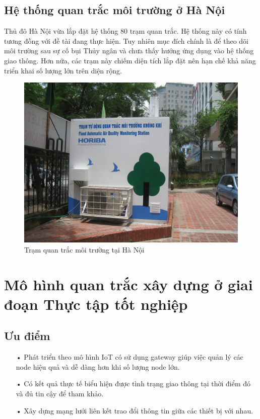 \subsection{Hệ thống quan trắc môi trường ở Hà Nội}
Thủ đô Hà Nội vừa lắp đặt hệ thống 80 trạm quan trắc. Hệ thống này có tính tương đồng với đề tài đang thực hiện. Tuy nhiên mục đích chính là để theo dõi môi trường sau sự cố bụi Thủy ngân và chưa thấy hướng ứng dụng vào hệ thống giao thông. Hơn nữa, các trạm này chiếm diện tích lắp đặt nên hạn chế khả năng triển khai số lượng lớn trên diện rộng.
\begin{figure}[H] 
	\centering    
	\includegraphics[width=1.0\textwidth]{pic3}
	\caption[Trạm quan trắc môi trường tại Hà Nội ]{Trạm quan trắc môi trường tại Hà Nội}
	\label{fig:pic3}
\end{figure}

\section{Mô hình quan trắc xây dựng ở giai đoạn Thực tập tốt nghiệp}


\subsection{Ưu điểm}
\begin{itemize}
	\item[•] Phát triển theo mô hình IoT có sử dụng gateway giúp việc quản lý các node hiệu quả và dễ dàng hơn khi số lượng node lớn.
	\item[•] Có kết quả thực tế biểu hiện được tình trạng giao thông tại thời điểm đó và đủ tin cậy để tham khảo.
	\item[•] Xây dựng mạng lưới liên kết trao đổi thông tin giữa các thiết bị với nhau.
\end{itemize}
